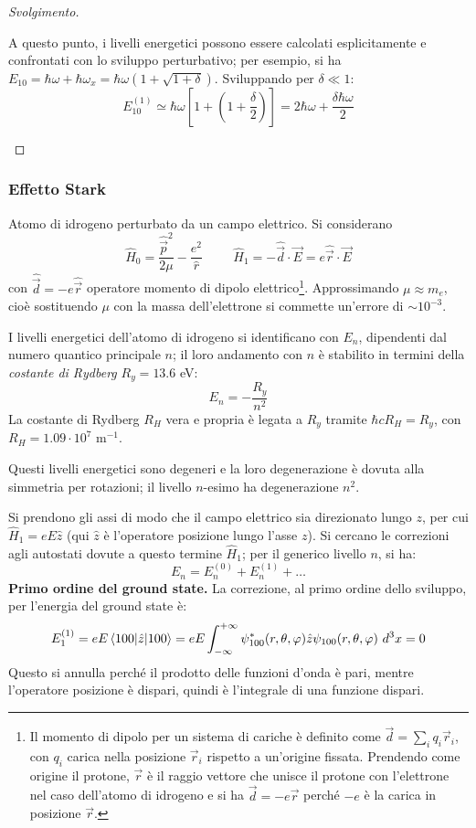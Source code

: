 \documentclass[11pt, a4paper]{scrartcl} %
\numberwithin{equation}{subsection}
\theoremstyle{style2}
\theoremstyle{style1}
\renewcommand\qedsymbol{$\blacksquare$}
\newenvironment{svolgimento}{\renewcommand\qedsymbol{$\spadesuit$}\begin{proof}[Svolgimento]}{\end{proof}}
\begin{document}
\begin{svolgimento}
\begin{enumerate}[(a).]
	A questo punto, i livelli energetici possono essere calcolati esplicitamente e confrontati con lo sviluppo perturbativo; per esempio, si ha $E_{10} = \hbar \omega + \hbar \omega_x= \hbar \omega \left(1 + \sqrt{1+\delta } \right) $.
	Sviluppando per $\delta \ll 1$:
	\[
		E^{(1)} _{10} \simeq \hbar \omega \left[1 + \left(1 + \frac{\delta }{2}\right) \right] = 2\hbar \omega + \frac{\delta \hbar \omega}{2}
	\] 
	

\end{enumerate}
	
\end{svolgimento}
\subsubsection{Effetto Stark}
Atomo di idrogeno perturbato da un campo elettrico. Si considerano
\[
\hat{H}_0 = \frac{\hat{\vec{p}}^2}{2\mu } - \frac{e^2}{\hat{r}} \hspace{1cm} \hat{H}_1 = - \hat{\vec{d}}\cdot \vec{E}=e\hat{\vec{r}}\cdot \vec{E}
\] 
con $\hat{\vec{d}}= - e \hat{\vec{r}}$ operatore momento di dipolo elettrico\footnote{Il momento di dipolo per un sistema di cariche \`e definito come $\vec{d} = \sum_{i}^{} q_i \vec{r}_i$, con $q_i$ carica nella posizione $\vec{r}_i$ rispetto a un'origine fissata. Prendendo come origine il protone, $\vec{r}$ \`e il raggio vettore che unisce il protone con l'elettrone nel caso dell'atomo di idrogeno e si ha $\vec{d}=-e \vec{r}$ perch\'e $-e$ \`e la carica in posizione $\vec{r}$.}.
Approssimando $\mu \approx m_e$, cio\`e sostituendo $\mu $ con la massa dell'elettrone si commette un'errore di $\sim 10^{-3} $.

I livelli energetici dell'atomo di idrogeno si identificano con $E_n$, dipendenti dal numero quantico principale $n$; il loro andamento con $n$ \`e stabilito in termini della \textit{costante di Rydberg} $R_y = 13.6$ eV:
\begin{equation}
	E_n = - \frac{R_y}{n^2}
\end{equation}
La costante di Rydberg $R_H$ vera e propria \`e legata a $R_y$ tramite $\hbar c R_H = R_y$, con $R_H = 1.09 \cdot 10^7 \text{ m}^{-1} $.

Questi livelli energetici sono degeneri e la loro degenerazione \`e dovuta alla simmetria per rotazioni; il livello $n$-esimo ha degenerazione $n^2$.

Si prendono gli assi di modo che il campo elettrico sia direzionato lungo $z$, per cui $\hat{H}_1 = e E \hat{z}$ (qui $\hat{z}$ \`e l'operatore posizione lungo l'asse $z$).
Si cercano le correzioni agli autostati dovute a questo termine $\hat{H}_1$; per il generico livello $n$, si ha:
\[
E_n = E_n^{(0)} + E_n^{(1)} +\ldots
\] 
{\sffamily\bfseries Primo ordine del ground state.}
La correzione, al primo ordine dello sviluppo, per l'energia del ground state \`e:
\[
	E_1^{(1)} = eE  \braket{100|\hat{z}|100} =eE \int_{-\infty} ^{+\infty}\psi^* _{100}(r,\theta ,\varphi )   \hat{z} \psi _{100} (r,\theta ,\varphi )\ d^3x = 0
\] 
Questo si annulla perch\'e il prodotto delle funzioni d'onda \`e pari, mentre l'operatore posizione \`e dispari, quindi \`e l'integrale di una funzione dispari.
\end{document}
